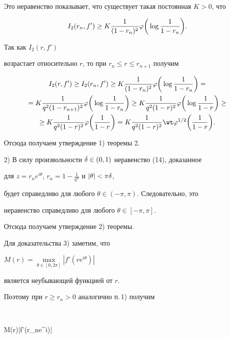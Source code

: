 Это неравенство показывает, что существует такая постоянная $K>0$, что


$$


I_2(r_n,f')\geq K\frac 1{(1-r_n)^2}\p\bigg(\log\frac 1{1-r_n}\bigg).


$$


Так как $I_2(r,f')$


возрастает относительно $r$, то при $r_n\leq r\leq r_{n+1}$ получим


\begin{multline*}


I_2(r,f')\geq I_2(r_n,f')\geq K\frac 1{(1-r_n)^2}\p


\bigg(\log\frac 1{1-r_n}\bigg)=\\


=K\frac 1{q^2(1-r_{n+1})^2}\p\bigg(\log\frac 1{1-r_n}\bigg)


\geq K\frac 1{q^2(1-r)^2}\p\bigg(\log\frac 1{1-r}\bigg)\geq \\


%


\ge K\frac 1{q^2(1-r)^2}\p\bigg(\frac 1{1-r}\bigg)=


K\frac 1{q^2(1-r)^2}\wt\p{}^{1/2}\bigg(\frac 1{1-r}\bigg).


\end{multline*}


Отсюда получаем утверждение 1) теоремы 2.





2) В силу произвольности $\delta\in(0,1)$ неравенство (14), доказанное


для $z=r_ne^{i\theta}$, $r_n=1-\frac 1{q^n}$ и $|\theta|<\pi\delta$,


будет справедливо для любого $\theta\in (-\pi,\pi)$. Следовательно, это


неравенство справедливо для любого $\theta\in [-\pi,\pi]$.


Отсюда получаем утверждение 2) теоремы.





Для доказательства 3) заметим, что


$M(r)=\max\limits_{\theta\in[0,2\pi]}|f'(re^{i\theta})|$


является неубывающей функцией от $r$.


Поэтому при $r\ge r_n>0$ аналогично п.\,1) получим


$$


M(r)\geq|f'(r_ne^{i\theta})|\geq


